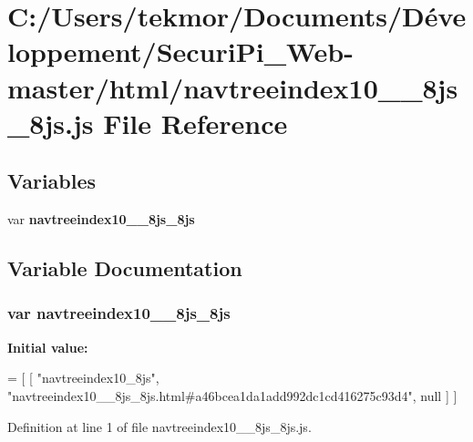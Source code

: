 \section{C\+:/\+Users/tekmor/\+Documents/\+Développement/\+Securi\+Pi\+\_\+\+Web-\/master/html/navtreeindex10\+\_\+\+\_\+8js\+\_\+8js.js File Reference}
\label{navtreeindex10____8js__8js_8js}
\subsection*{Variables}
\begin{DoxyCompactItemize}
\item 
var {\bf navtreeindex10\+\_\+\+\_\+8js\+\_\+8js}
\end{DoxyCompactItemize}


\subsection{Variable Documentation}
\subsubsection[{navtreeindex10\+\_\+\+\_\+8js\+\_\+8js}]{\setlength{\rightskip}{0pt plus 5cm}var navtreeindex10\+\_\+\+\_\+8js\+\_\+8js}\label{navtreeindex10____8js__8js_8js_a3b5ee954a2aad0732cc372c3ca8b3a4a}
{\bfseries Initial value\+:}
\begin{DoxyCode}
=
[
    [ \textcolor{stringliteral}{"navtreeindex10\_8js"}, \textcolor{stringliteral}{"navtreeindex10\_\_8js\_8js.html#a46bcea1da1add992dc1cd416275c93d4"}, null ]
]
\end{DoxyCode}


Definition at line 1 of file navtreeindex10\+\_\+\+\_\+8js\+\_\+8js.\+js.

